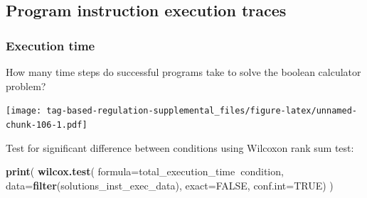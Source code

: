\documentclass[]{book}
\newenvironment{Shaded}{\begin{snugshade}}{\end{snugshade}}
\newcommand{\CharTok}[1]{\textcolor[rgb]{0.31,0.60,0.02}{#1}}
\newcommand{\CommentTok}[1]{\textcolor[rgb]{0.56,0.35,0.01}{\textit{#1}}}
\newcommand{\DataTypeTok}[1]{\textcolor[rgb]{0.13,0.29,0.53}{#1}}
\newcommand{\FloatTok}[1]{\textcolor[rgb]{0.00,0.00,0.81}{#1}}
\newcommand{\KeywordTok}[1]{\textcolor[rgb]{0.13,0.29,0.53}{\textbf{#1}}}
\newcommand{\NormalTok}[1]{#1}
\newcommand{\OperatorTok}[1]{\textcolor[rgb]{0.81,0.36,0.00}{\textbf{#1}}}
\newcommand{\OtherTok}[1]{\textcolor[rgb]{0.56,0.35,0.01}{#1}}
\newcommand{\StringTok}[1]{\textcolor[rgb]{0.31,0.60,0.02}{#1}}
\begin{document}
\hypertarget{program-instruction-execution-traces-3}{%
\subsection{Program instruction execution traces}\label{program-instruction-execution-traces-3}}

\hypertarget{execution-time-3}{%
\subsubsection{Execution time}\label{execution-time-3}}

How many time steps do successful programs take to solve the boolean calculator problem?

\begin{Shaded}
\end{Shaded}

\texttt{[image: tag-based-regulation-supplemental\_files/figure-latex/unnamed-chunk-106-1.pdf]}

Test for significant difference between conditions using Wilcoxon rank sum test:

\begin{Shaded}
\begin{Highlighting}[]
\KeywordTok{print}\NormalTok{(}
  \KeywordTok{wilcox.test}\NormalTok{(}
    \DataTypeTok{formula=}\NormalTok{total_execution_time}\OperatorTok{~}\NormalTok{condition,}
    \DataTypeTok{data=}\KeywordTok{filter}\NormalTok{(solutions_inst_exec_data),}
    \DataTypeTok{exact=}\OtherTok{FALSE}\NormalTok{,}
    \DataTypeTok{conf.int=}\OtherTok{TRUE}\NormalTok{)}
\NormalTok{)}
\end{Highlighting}
\end{Shaded}
\end{document}
